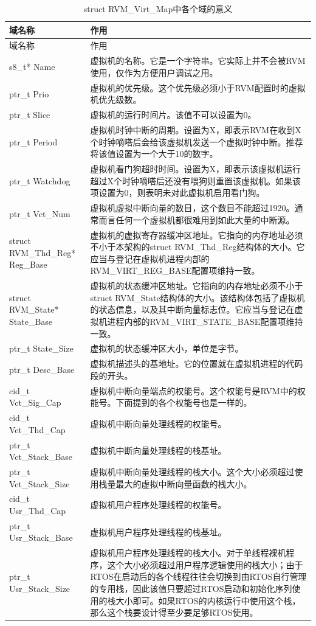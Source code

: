 \begin{xltabular}{\textwidth}{@{}>{\hsize\raggedright\arraybackslash}X>{\hsize\raggedright\arraybackslash}X@{}}
\caption{struct RVM\_\allowbreak{}Virt\_\allowbreak{}Map中各个域的意义}\label{tab:4-1}\\
\toprule
域名称 & 作用\tabularnewline
\endfirsthead
\toprule
域名称 & 作用\tabularnewline
\midrule
\endhead
\bottomrule
\endlastfoot
s8\_\allowbreak{}t* Name &
虚拟机的名称。它是一个字符串。它实际上并不会被RVM使用，仅作为方便用户调试之用。\tabularnewline
ptr\_\allowbreak{}t Prio &
虚拟机的优先级。这个优先级必须小于RVM配置时的虚拟机优先级数。\tabularnewline
ptr\_\allowbreak{}t Slice & 虚拟机的运行时间片。该值不可以设置为0。\tabularnewline
ptr\_\allowbreak{}t Period &
虚拟机时钟中断的周期。设置为X，即表示RVM在收到X个时钟嘀嗒后会给该虚拟机发送一个虚拟时钟中断。推荐将该值设置为一个大于10的数字。\tabularnewline
ptr\_\allowbreak{}t Watchdog &
虚拟机看门狗超时时间。设置为X，即表示该虚拟机运行超过X个时钟嘀嗒后还没有喂狗则重置该虚拟机。如果该项设置为0，则表明未对此虚拟机启用看门狗。\tabularnewline
ptr\_\allowbreak{}t Vct\_\allowbreak{}Num &
虚拟机虚拟中断向量的数目，这个数目不能超过1920。通常而言任何一个虚拟机都很难用到如此大量的中断源。\tabularnewline
struct RVM\_\allowbreak{}Thd\_\allowbreak{}Reg* Reg\_\allowbreak{}Base &
虚拟机的虚拟寄存器缓冲区地址。它指向的内存地址必须不小于本架构的struct RVM\_Thd\_Reg结构体的大小。它应当与登记在虚拟机进程内部的RVM\_VIRT\_REG\_BASE配置项维持一致。\tabularnewline
struct RVM\_\allowbreak{}State* State\_\allowbreak{}Base &
虚拟机的状态缓冲区地址。它指向的内存地址必须不小于struct RVM\_State结构体的大小。该结构体包括了虚拟机的状态信息，以及其中断向量标志位。它应当与登记在虚拟机进程内部的RVM\_\allowbreak{}VIRT\_\allowbreak{}STATE\_\allowbreak{}BASE配置项维持一致。\tabularnewline
ptr\_\allowbreak{}t State\_\allowbreak{}Size & 虚拟机的状态缓冲区大小，单位是字节。\tabularnewline
ptr\_\allowbreak{}t Desc\_\allowbreak{}Base &
虚拟机描述头的基地址。它的位置就在虚拟机进程的代码段的开头。\tabularnewline
cid\_\allowbreak{}t Vct\_\allowbreak{}Sig\_\allowbreak{}Cap &
虚拟机中断向量端点的权能号。这个权能号是RVM中的权能号。下面提到的各个权能号也是一样的。\tabularnewline
cid\_\allowbreak{}t Vct\_\allowbreak{}Thd\_\allowbreak{}Cap & 虚拟机中断向量处理线程的权能号。\tabularnewline
ptr\_\allowbreak{}t Vct\_\allowbreak{}Stack\_\allowbreak{}Base &
虚拟机中断向量处理线程的栈基址。\tabularnewline
ptr\_\allowbreak{}t Vct\_\allowbreak{}Stack\_\allowbreak{}Size &
虚拟机中断向量处理线程的栈大小。这个大小必须超过使用栈量最大的虚拟中断向量函数的栈大小。\tabularnewline
cid\_\allowbreak{}t Usr\_\allowbreak{}Thd\_\allowbreak{}Cap & 虚拟机用户程序处理线程的权能号。\tabularnewline
ptr\_\allowbreak{}t Usr\_\allowbreak{}Stack\_\allowbreak{}Base &
虚拟机用户程序处理线程的栈基址。\tabularnewline
ptr\_\allowbreak{}t Usr\_\allowbreak{}Stack\_\allowbreak{}Size &
虚拟机用户程序处理线程的栈大小。对于单线程裸机程序，这个大小必须超过用户程序逻辑使用的栈大小；由于RTOS在启动后的各个线程往往会切换到由RTOS自行管理的专用栈，因此该值只要超过RTOS启动和初始化序列使用的栈大小即可。如果RTOS的内核运行中使用这个栈，那么这个栈要设计得至少要足够RTOS使用。\tabularnewline
\end{xltabular}

